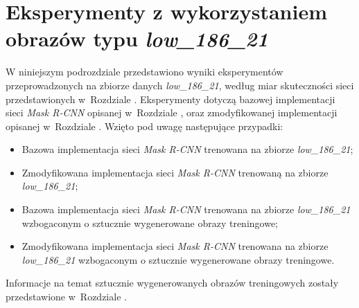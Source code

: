 \section{Eksperymenty z wykorzystaniem obrazów typu \textit{low\_186\_21}}
\label{sec:experymenty_low}
W niniejszym podrozdziale przedstawiono wyniki eksperymentów przeprowadzonych na zbiorze danych \textit{low\_186\_21}, według miar skuteczności sieci przedstawionych w~Rozdziale .
Eksperymenty dotyczą bazowej implementacji sieci \textit{Mask R-CNN} \cite{matterport-mask-rcnn} opisanej w~Rozdziale , oraz zmodyfikowanej implementacji opisanej w~Rozdziale .
 Wzięto pod uwagę następujące przypadki:

\begin{itemize}
 \item Bazowa implementacja sieci \textit{Mask R-CNN} trenowana na zbiorze \textit{low\_186\_21};
 \item Zmodyfikowana implementacja sieci \textit{Mask R-CNN} trenowaną na zbiorze \textit{low\_186\_21};
 \item Bazowa implementacja sieci \textit{Mask R-CNN} trenowana na zbiorze \textit{low\_186\_21} wzbogaconym o sztucznie wygenerowane obrazy treningowe;
 \item Zmodyfikowana implementacja sieci \textit{Mask R-CNN} trenowana na zbiorze \textit{low\_186\_21} wzbogaconym o sztucznie wygenerowane obrazy treningowe.
\end{itemize}

Informacje na temat sztucznie wygenerowanych obrazów treningowych zostały przedstawione w~Rozdziale .
